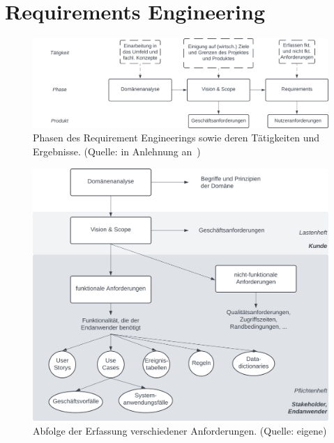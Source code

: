 \section{Requirements Engineering}

\begin{figure}
    \centering
    \includegraphics[scale=0.35]{chapters/Anhang/CheatSheets/img/requirementsengineering}
    \caption{Phasen des Requirement Engineerings sowie deren Tätigkeiten und Ergebnisse. (Quelle: in Anlehnung an~\cite[84]{Wed09})}
    \label{fig:requirementsengineering_cc}
\end{figure}

\begin{figure}
    \centering
    \includegraphics[scale=0.35]{chapters/Anhang/CheatSheets/img/anforderung}
    \caption{Abfolge der Erfassung verschiedener Anforderungen. (Quelle: eigene)}
    \label{fig:anforderung_cc}
\end{figure}